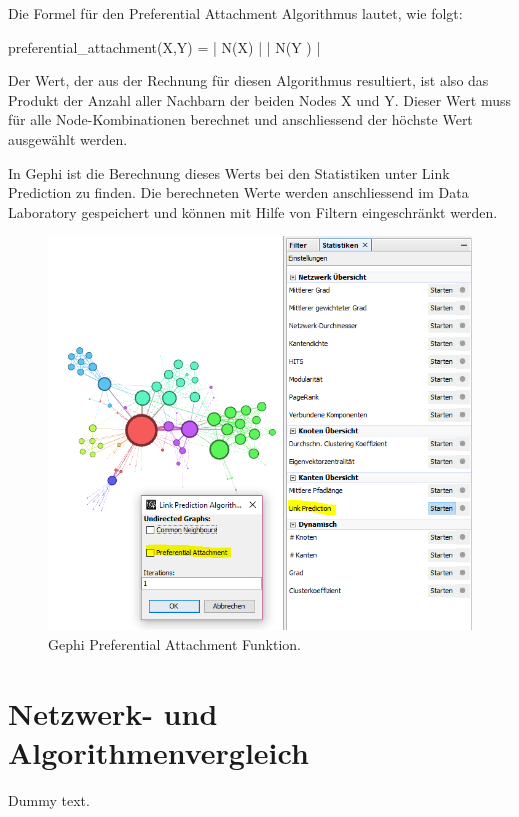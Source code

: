 Die Formel für den Preferential Attachment Algorithmus lautet, wie folgt:

preferential_attachment(X,Y) = | N(X) | \cdot | N(Y ) |

Der Wert, der aus der Rechnung für diesen Algorithmus resultiert, ist also das Produkt der Anzahl aller Nachbarn der
beiden Nodes X und Y. Dieser Wert muss für alle Node-Kombinationen berechnet und anschliessend der höchste Wert
ausgewählt werden.

In Gephi ist die Berechnung dieses Werts bei den Statistiken unter Link Prediction zu finden. Die berechneten Werte
werden anschliessend im Data Laboratory gespeichert und können mit Hilfe von Filtern eingeschränkt werden.

\begin{figure}[htbp]
    \includegraphics[width=\linewidth]{resources/gephi-PA.png}
    \caption{Gephi Preferential Attachment Funktion.}
    \label{fig:screen9}
\end{figure}

\section{Netzwerk- und Algorithmenvergleich}

Dummy text.